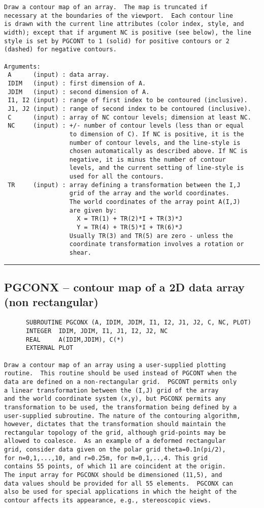 {\begin{verbatim}
Draw a contour map of an array.  The map is truncated if
necessary at the boundaries of the viewport.  Each contour line
is drawn with the current line attributes (color index, style, and
width); except that if argument NC is positive (see below), the line
style is set by PGCONT to 1 (solid) for positive contours or 2
(dashed) for negative contours.

Arguments:
 A      (input) : data array.
 IDIM   (input) : first dimension of A.
 JDIM   (input) : second dimension of A.
 I1, I2 (input) : range of first index to be contoured (inclusive).
 J1, J2 (input) : range of second index to be contoured (inclusive).
 C      (input) : array of NC contour levels; dimension at least NC.
 NC     (input) : +/- number of contour levels (less than or equal
                  to dimension of C). If NC is positive, it is the
                  number of contour levels, and the line-style is
                  chosen automatically as described above. If NC is
                  negative, it is minus the number of contour
                  levels, and the current setting of line-style is
                  used for all the contours.
 TR     (input) : array defining a transformation between the I,J
                  grid of the array and the world coordinates.
                  The world coordinates of the array point A(I,J)
                  are given by:
                    X = TR(1) + TR(2)*I + TR(3)*J
                    Y = TR(4) + TR(5)*I + TR(6)*J
                  Usually TR(3) and TR(5) are zero - unless the
                  coordinate transformation involves a rotation or
                  shear.
\end{verbatim}
\hrule


\subsection*{PGCONX -- contour map of a 2D data array (non rectangular) }
\begin{verbatim}
      SUBROUTINE PGCONX (A, IDIM, JDIM, I1, I2, J1, J2, C, NC, PLOT)
      INTEGER  IDIM, JDIM, I1, J1, I2, J2, NC
      REAL     A(IDIM,JDIM), C(*)
      EXTERNAL PLOT

Draw a contour map of an array using a user-supplied plotting
routine.  This routine should be used instead of PGCONT when the
data are defined on a non-rectangular grid.  PGCONT permits only
a linear transformation between the (I,J) grid of the array
and the world coordinate system (x,y), but PGCONX permits any
transformation to be used, the transformation being defined by a
user-supplied subroutine. The nature of the contouring algorithm,
however, dictates that the transformation should maintain the
rectangular topology of the grid, although grid-points may be
allowed to coalesce.  As an example of a deformed rectangular
grid, consider data given on the polar grid theta=0.1n(pi/2),
for n=0,1,...,10, and r=0.25m, for m=0,1,..,4. This grid
contains 55 points, of which 11 are coincident at the origin.
The input array for PGCONX should be dimensioned (11,5), and
data values should be provided for all 55 elements.  PGCONX can
also be used for special applications in which the height of the
contour affects its appearance, e.g., stereoscopic views.


\end{verbatim}}
